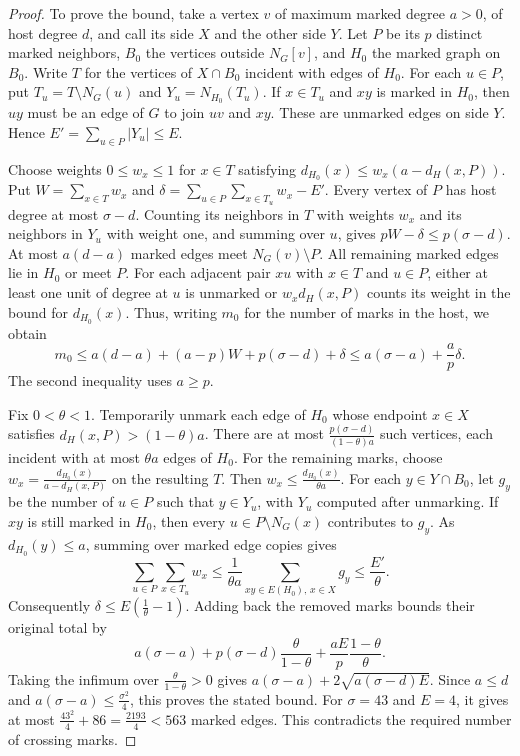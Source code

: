 \documentclass[preprint,11pt,numbers]{elsarticle-arxiv}
\numberwithin{equation}{section}
\theoremstyle{definition}
\begin{document}
\begin{proof}
To prove the bound, take a vertex $v$ of maximum marked degree $a>0$,
of host degree $d$, and call its side $X$ and the other side $Y$.
Let $P$ be its $p$ distinct marked neighbors, $B_0$ the vertices
outside $N_G[v]$, and $H_0$ the marked graph on $B_0$.
Write $T$ for the vertices of $X\cap B_0$ incident with edges
of $H_0$. For each $u\in P$, put $T_u=T\setminus N_G(u)$ and
$Y_u=N_{H_0}(T_u)$. If $x\in T_u$ and $xy$ is marked in $H_0$,
then $uy$ must be an edge of $G$ to join $uv$ and $xy$. These are
unmarked edges on side $Y$. Hence $E'=\sum_{u\in P}|Y_u|\leq E$.

Choose weights $0\leq w_x\leq1$ for $x\in T$ satisfying
$d_{H_0}(x)\leq w_x(a-d_H(x,P))$. Put $W=\sum_{x\in T}w_x$
and $\delta=\sum_{u\in P}\sum_{x\in T_u}w_x-E'$.
Every vertex of $P$ has host degree at most $\sigma-d$.
Counting its neighbors in $T$ with weights $w_x$ and its neighbors
in $Y_u$ with weight one, and summing over $u$, gives
$pW-\delta\leq p(\sigma-d)$.
At most $a(d-a)$ marked edges meet $N_G(v)\setminus P$.
All remaining marked edges lie in $H_0$ or meet $P$.
For each adjacent pair $xu$ with $x\in T$ and $u\in P$,
either at least one unit of degree at $u$ is unmarked or
$w_x d_H(x,P)$ counts its weight in the bound for $d_{H_0}(x)$.
Thus, writing $m_0$ for the number of marks in the host, we obtain
\[
 m_0\leq a(d-a)+(a-p)W+p(\sigma-d)+\delta
 \leq a(\sigma-a)+\frac{a}{p}\delta.
\]
The second inequality uses $a\geq p$.

Fix $0<\theta<1$. Temporarily unmark each edge of $H_0$ whose
endpoint $x\in X$ satisfies $d_H(x,P)>(1-\theta)a$. There are at
most $\frac{p(\sigma-d)}{(1-\theta)a}$ such vertices, each incident
with at most $\theta a$ edges of $H_0$. For the remaining marks,
choose $w_x=\frac{d_{H_0}(x)}{a-d_H(x,P)}$ on the resulting $T$.
Then $w_x\leq\frac{d_{H_0}(x)}{\theta a}$. For each $y\in Y\cap B_0$,
let $g_y$ be the number of $u\in P$ such that $y\in Y_u$, with
$Y_u$ computed after unmarking. If $xy$ is still marked in $H_0$,
then every $u\in P\setminus N_G(x)$ contributes to $g_y$. As
$d_{H_0}(y)\leq a$, summing over marked edge copies gives
\[
 \sum_{u\in P}\sum_{x\in T_u}w_x
 \leq\frac{1}{\theta a}\sum_{xy\in E(H_0),\,x\in X}g_y
 \leq\frac{E'}{\theta}.
\]
Consequently $\delta\leq E(\frac{1}{\theta}-1)$. Adding back the
removed marks bounds their original total by
\[
 a(\sigma-a)+p(\sigma-d)\frac{\theta}{1-\theta}
              +\frac{aE}{p}\frac{1-\theta}{\theta}.
\]
Taking the infimum over $\frac{\theta}{1-\theta}>0$ gives
$a(\sigma-a)+2\sqrt{a(\sigma-d)E}$. Since $a\le d$ and
$a(\sigma-a)\le\frac{\sigma^2}{4}$, this proves the stated bound.
For $\sigma=43$ and $E=4$, it gives at most
$\frac{43^2}{4}+86=\frac{2193}{4}<563$ marked edges. This
contradicts the required number of crossing marks.
\end{proof}
\end{document}
